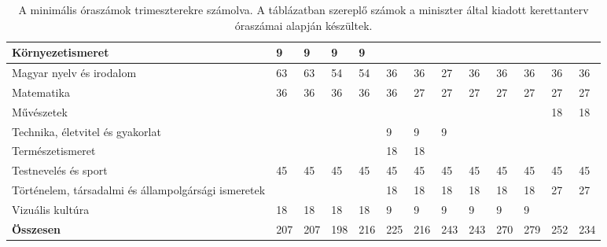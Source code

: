 \begin{landscape}
\begin{table}[]
{\begin{tabular}{l|l|l|l|l|l|l|l|l|l|l|l|l}
    Környezetismeret                                    & 9   & 9   & 9   & 9   &     &     &     &     &     &     &     &     \\\hline
    Magyar nyelv és irodalom                            & 63  & 63  & 54  & 54  & 36  & 36  & 27  & 36  & 36  & 36  & 36  & 36  \\\hline
    Matematika                                          & 36  & 36  & 36  & 36  & 36  & 27  & 27  & 27  & 27  & 27  & 27  & 27  \\\hline
    Művészetek                                          &     &     &     &     &     &     &     &     &     &     & 18  & 18  \\\hline
    Technika, életvitel és gyakorlat                    &     &     &     &     & 9   & 9   & 9   &     &     &     &     &     \\\hline
    Természetismeret                                    &     &     &     &     & 18  & 18  &     &     &     &     &     &     \\\hline
    Testnevelés és sport                                & 45  & 45  & 45  & 45  & 45  & 45  & 45  & 45  & 45  & 45  & 45  & 45  \\\hline
    Történelem, társadalmi és állampolgársági ismeretek &     &     &     &     & 18  & 18  & 18  & 18  & 18  & 18  & 27  & 27  \\\hline
    Vizuális kultúra                                    & 18  & 18  & 18  & 18  & 9   & 9   & 9   & 9   & 9   & 9   &     &     \\\hline \hline
    \textbf{Összesen}                                   & 207 & 207 & 198 & 216 & 225 & 216 & 243 & 243 & 270 & 279 & 252 & 234
    

  \end{tabular}
}
  \caption{A minimális óraszámok trimeszterekre számolva. A táblázatban szereplő számok a miniszter által kiadott kerettanterv óraszámai alapján készültek.}  
  \label{tbl:oraszamok}

\end{table}

\end{landscape}
